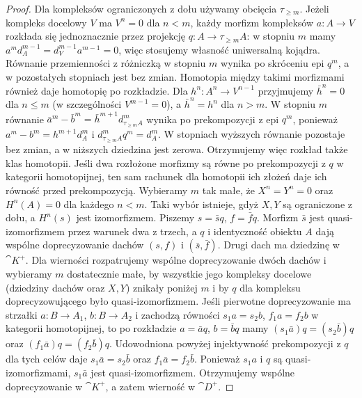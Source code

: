 \begin{proof}
Dla kompleksów ograniczonych z dołu używamy obcięcia $\tau_{\ge m}$. Jeżeli kompleks docelowy $V$ ma $V^n=0$ dla $n<m$, każdy morfizm kompleksów $a:A\to V$ rozkłada się jednoznacznie przez projekcję $q:A\to\tau_{\ge m}A$: w stopniu $m$ mamy $a^md_A^{m-1}=d_V^{m-1}a^{m-1}=0$, więc stosujemy własność uniwersalną kojądra. Równanie przemienności z różniczką w stopniu $m$ wynika po skróceniu epi $q^m$, a w pozostałych stopniach jest bez zmian. Homotopia między takimi morfizmami również daje homotopię po rozkładzie. Dla $h^n:A^n\to V^{n-1}$ przyjmujemy $\bar h^n=0$ dla $n\le m$ (w szczególności $V^{m-1}=0$), a $\bar h^n=h^n$ dla $n>m$. W stopniu $m$ równanie $\bar a^m-\bar b^m=\bar h^{m+1}d_{\tau_{\ge m}A}^m$ wynika po prekompozycji z epi $q^m$, ponieważ $a^m-b^m=h^{m+1}d_A^m$ i $d_{\tau_{\ge m}A}^mq^m=d_A^m$. W stopniach wyższych równanie pozostaje bez zmian, a w niższych dziedzina jest zerowa. Otrzymujemy więc rozkład także klas homotopii. Jeśli dwa rozłożone morfizmy są równe po prekompozycji z $q$ w kategorii homotopijnej, ten sam rachunek dla homotopii ich złożeń daje ich równość przed prekompozycją. Wybieramy $m$ tak małe, że $X^n=Y^n=0$ oraz $H^n(A)=0$ dla każdego $n<m$. Taki wybór istnieje, gdyż $X,Y$ są ograniczone z dołu, a $H^n(s)$ jest izomorfizmem. Piszemy $s=\bar s q$, $f=\bar f q$. Morfizm $\bar s$ jest quasi-izomorfizmem przez warunek dwa z trzech, a $q$ i identyczność obiektu $A$ dają wspólne doprecyzowanie dachów $(s,f)$ i $(\bar s,\bar f)$. Drugi dach ma dziedzinę w $\cat K^+$. Dla wierności rozpatrujemy wspólne doprecyzowanie dwóch dachów i wybieramy $m$ dostatecznie małe, by wszystkie jego kompleksy docelowe (dziedziny dachów oraz $X,Y$) znikały poniżej $m$ i by $q$ dla kompleksu doprecyzowującego było quasi-izomorfizmem. Jeśli pierwotne doprecyzowanie ma strzałki $a:B\to A_1$, $b:B\to A_2$ i zachodzą równości $s_1a=s_2b$, $f_1a=f_2b$ w kategorii homotopijnej, to po rozkładzie $a=\bar a q$, $b=\bar b q$ mamy $(s_1\bar a)q=(s_2\bar b)q$ oraz $(f_1\bar a)q=(f_2\bar b)q$. Udowodniona powyżej injektywność prekompozycji z $q$ dla tych celów daje $s_1\bar a=s_2\bar b$ oraz $f_1\bar a=f_2\bar b$. Ponieważ $s_1a$ i $q$ są quasi-izomorfizmami, $s_1\bar a$ jest quasi-izomorfizmem. Otrzymujemy wspólne doprecyzowanie w $\cat K^+$, a zatem wierność w $\cat D^+$.


\end{proof}

